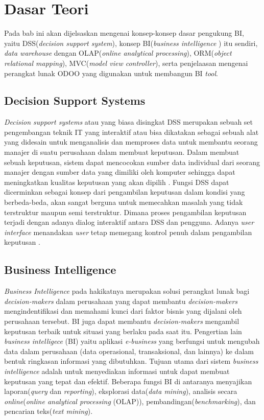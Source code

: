 \chapter{Dasar Teori}
\label{chap:definition}
Pada bab ini akan dijelsaskan mengenai konsep-konsep dasar pengukung BI, yaitu DSS(\textit{decision support system}), konsep BI(\textit{business intelligence }) itu sendiri, \textit{data warehouse} dengan OLAP(\textit{online analytical processing}), ORM(\textit{object relational mapping}), MVC(\textit{model view controller}), serta penjelaasan mengenai perangkat lunak ODOO yang digunakan untuk membangun BI \textit{tool}.

\section{Decision Support Systems}
\textit{Decision support systems} atau yang biasa disingkat DSS merupakan sebuah set pengembangan teknik IT yang interaktif atau bisa dikatakan sebagai sebuah alat yang didesain untuk menganalisis dan memproses data untuk membantu seorang manajer di suatu perusahaan dalam membuat keputusan. Dalam membuat sebuah keputusan, sistem dapat mencocokan sumber data individual dari seorang manajer dengan sumber data yang dimiliki oleh komputer sehingga dapat meningkatkan kualitas keputusan yang akan dipilih \cite{Matteo:2009}. Fungsi DSS dapat dicerminkan sebagai konsep dari pengambilan keputusan dalam kondisi yang berbeda-beda, akan sangat berguna untuk memecahkan masalah yang tidak terstruktur maupun semi terstruktur. Dimana proses pengambilan keputusan terjadi dengan adanya dialog interaktif antara DSS dan pengguna. Adanya \textit{user interface} menandakan \textit{user} tetap memegang kontrol penuh dalam pengambilan keputusan \cite{rassoblog}.   

\section{Business Intelligence}

\textit{Business Intelligence} pada hakikatnya merupakan solusi perangkat lunak bagi \textit{decision-makers} dalam perusahaan yang dapat membantu \textit{decision-makers} mengindentifikasi dan memahami kunci dari faktor bisnis yang dijalani oleh perusahaan tersebut. BI juga dapat membantu \textit{decision-makers} mengambil keputusan terbaik untuk situasi yang berlaku pada saat itu\cite{Matteo:2009}. Pengertian lain \textit{business intelligece} (BI) yaitu aplikasi
\textit{e-business} yang berfungsi untuk mengubah data dalam perusahaan (data operasional, transaksional, dan lainnya) ke dalam bentuk ringkasan informasi yang dibutuhkan. Tujuan utama dari sistem \textit{business intelligence} adalah untuk menyediakan informasi untuk dapat membuat keputusan yang tepat dan efektif. Beberapa fungsi BI di antaranya menyajikan laporan(\textit{query} dan \textit{reporting}), eksplorasi data(\textit{data mining}), analisis secara \textit{online}(\textit{online analytical processing} (OLAP)), pembandingan(\textit{benchmarking}), dan pencarian teks(\textit{text mining}). \cite{Carlo:2009}

